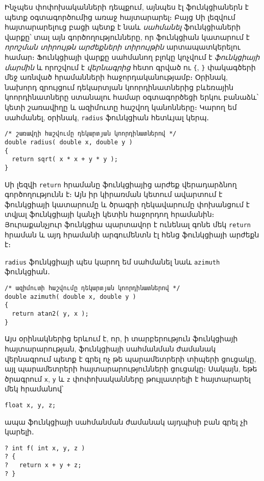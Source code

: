 Ինչպես փոփոխականների դեպքում, այնպես էլ ֆունկցիաներն է պետք օգտագործումից
առաջ հայտարարել։ Բայց Սի լեզվում հայտարարելուց բացի պետք է նաև \emph{սահմանել}
ֆունկցիաների վարքը՝ տալ այն գործողությունները, որ ֆունկցիան կատարում է
\emph{որոշման տիրույթն} \emph{արժեքների տիրույթին} արտապատկերելու համար։
Ֆունկցիայի վարքը սահմանող բլոկը կոչվում է \emph{ֆունկցիայի մարմին} և որոշվում
է \emph{վերնագրից} հետո գրված ու \verb|{|, \verb|}| փակագծերի մեջ առնված
հրամանների հաջորդականությամբ։ Օրինակ, նախորդ զրույցում դեկարտյան կոորդինատներից
բևեռային կոորդինատները ստանալու համար օգտագործեցի երկու բանաձև՝ կետի շառավիղը
և ազիմուտը հաշվող կանոնները։ Կարող եմ սահմանել, օրինակ, \texttt{radius}
ֆունկցիան հետևյալ կերպ․

\begin{Verbatim}
/* շառավղի հաշվումը դեկարտյան կոորդինատներով */
double radius( double x, double y )
{
  return sqrt( x * x + y * y );
}
\end{Verbatim}

Սի լեզվի \texttt{return} հրամանը ֆունկցիայից արժեք վերադարձնող գործողությունն
է։ Այն իր կիրառման կետում ավարտում է ֆունկցիայի կատարումը և ծրագրի ղեկավարումը
փոխանցում է տվյալ ֆունկցիայի կանչի կետին հաջորդող հրամանին։ Յուրաքանչյուր
ֆունկցիա պարտավոր է ունենալ գոնե մեկ \texttt{return} հրաման և այդ հրամանի
արգումենտն էլ հենց ֆունկցիայի արժեքն է։

\texttt{radius} ֆունկցիայի պես կարող եմ սահմանել նաև \texttt{azimuth} ֆունկցիան․

\begin{Verbatim}
/* ազիմուտի հաշվումը դեկարտյան կոորդինատներով */
double azimuth( double x, double y )
{
  return atan2( y, x );
}
\end{Verbatim}

Այս օրինակներից երևում է, որ, ի տարբերություն ֆունկցիայի հայտարարության,
ֆունկցիայի սահմանման ժամանակ վերնագրում պետք է գրել ոչ թե պարամետրերի տիպերի
ցուցակը, այլ պարամետրերի հայտարարությունների ցուցակը։ Սակայն, եթե ծրագրում
\texttt{x}, \texttt{y} և \texttt{z} փոփոխականները թույլատրելի է հայտարարել
մեկ հրամանով՝

\begin{Verbatim}
float x, y, z;
\end{Verbatim}

ապա ֆունկցիայի սահմանման ժամանակ այդպիսի բան գրել չի կարելի․

\begin{Verbatim}
? int f( int x, y, z )
? {
?   return x + y + z;
? }
\end{Verbatim}

